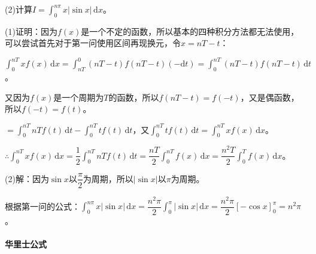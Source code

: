 \documentclass[UTF8, 12pt]{ctexart}
\begin{document}
        (2)计算$I=\int_0^{n\pi}x\vert\sin x\vert\,\textrm{d}x$。

        (1)证明：因为$f(x)$是一个不定的函数，所以基本的四种积分方法都无法使用，可以尝试首先对于第一问使用区间再现换元，令$x=nT-t$：

        $\int_0^{nT}xf(x)\,\textrm{d}x=\int_{nT}^0(nT-t)f(nT-t)(-\textrm{d}t)=\int_0^{nT}(nT-t)f(nT-t)\,\textrm{d}t$。

        又因为$f(x)$是一个周期为$T$的函数，所以$f(nT-t)=f(-t)$，又是偶函数，所以$f(-t)=f(t)$。

        $=\int_0^{nT}nTf(t)\,\textrm{d}t-\int_0^{nT}tf(t)\,\textrm{d}t$，又$\int_0^{nT}tf(t)\,\textrm{d}t=\int_0^{nT}xf(x)\,\textrm{d}x$。

        $\therefore\int_0^{nT}xf(x)\,\textrm{d}x=\dfrac{1}{2}\int_0^{nT}nTf(t)\,\textrm{d}t=\dfrac{nT}{2}\int_0^{nT}f(x)\,\textrm{d}x=\dfrac{n^2T}{2}\int_0^Tf(x)\,\textrm{d}x$。

        (2)解：因为$\sin x$以$\dfrac{\pi}{2}$为周期，所以$\vert\sin x\vert$以$\pi$为周期。

        根据第一问的公式：$\int_0^{n\pi}x\vert\sin x\vert\,\textrm{d}x=\dfrac{n^2\pi}{2}\int_0^\pi\vert\sin x\vert\,\textrm{d}x=\dfrac{n^2\pi}{2}[-\cos x]_0^\pi=n^2\pi$。

        \paragraph{华里士公式} \leavevmode \medskip
\end{document}
